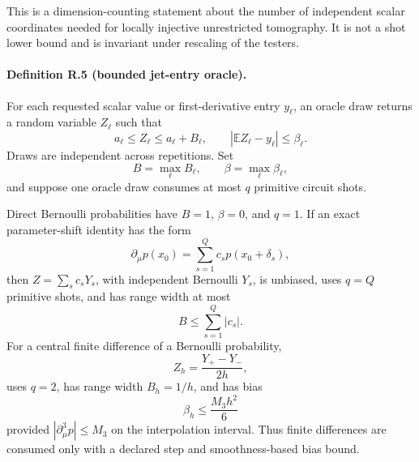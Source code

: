\documentclass[aps,prl,onecolumn,superscriptaddress,nofootinbib]{revtex4-2}
\begin{document}
This is a dimension-counting statement about the number of independent scalar coordinates needed for locally injective unrestricted tomography.  It is not a shot lower bound and is invariant under rescaling of the testers.

\paragraph{Definition R.5 (bounded jet-entry oracle).}
For each requested scalar value or first-derivative entry $y_\ell$, an oracle draw returns a random variable $Z_{\ell}$ such that
\begin{equation}
 a_\ell\le Z_\ell\le a_\ell+B_\ell,
 \qquad
 |\mathbb E Z_\ell-y_\ell|\le\beta_\ell.
 \label{eq:jet-oracle}
\end{equation}
Draws are independent across repetitions.  Set
\begin{equation}
 B=\max_\ell B_\ell,
 \qquad
 \beta=\max_\ell\beta_\ell,
\end{equation}
and suppose one oracle draw consumes at most $q$ primitive circuit shots.

Direct Bernoulli probabilities have $B=1$, $\beta=0$, and $q=1$.  If an exact parameter-shift identity has the form
\begin{equation}
 \partial_\mu p(x_0)=\sum_{s=1}^{Q}c_s p(x_0+\delta_s),
 \label{eq:parameter-shift-oracle}
\end{equation}
then $Z=\sum_sc_sY_s$, with independent Bernoulli $Y_s$, is unbiased, uses $q=Q$ primitive shots, and has range width at most
\begin{equation}
 B\le\sum_{s=1}^{Q}|c_s|.
\end{equation}
For a central finite difference of a Bernoulli probability,
\begin{equation}
 Z_h=\frac{Y_+-Y_-}{2h},
 \label{eq:finite-difference-oracle}
\end{equation}
uses $q=2$, has range width $B_h=1/h$, and has bias
\begin{equation}
 \beta_h\le\frac{M_3h^2}{6}
 \label{eq:finite-difference-bias}
\end{equation}
provided $|\partial_\mu^3p|\le M_3$ on the interpolation interval.  Thus finite differences are consumed only with a declared step and smoothness-based bias bound.
\end{document}
